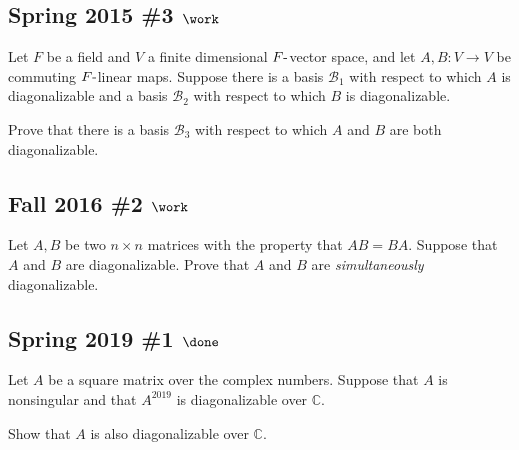 \hypertarget{spring-2015-3-work}{%
\subsection{\texorpdfstring{Spring 2015 \#3
\(\work\)}{Spring 2015 \#3 \textbackslash work}}\label{spring-2015-3-work}}

Let \(F\) be a field and \(V\) a finite dimensional
\(F{\hbox{-}}\)vector space, and let \(A, B: V\to V\) be commuting
\(F{\hbox{-}}\)linear maps. Suppose there is a basis \({\mathcal{B}}_1\)
with respect to which \(A\) is diagonalizable and a basis
\({\mathcal{B}}_2\) with respect to which \(B\) is diagonalizable.

Prove that there is a basis \({\mathcal{B}}_3\) with respect to which
\(A\) and \(B\) are both diagonalizable.

\hypertarget{fall-2016-2-work}{%
\subsection{\texorpdfstring{Fall 2016 \#2
\(\work\)}{Fall 2016 \#2 \textbackslash work}}\label{fall-2016-2-work}}

Let \(A, B\) be two \(n\times n\) matrices with the property that
\(AB = BA\). Suppose that \(A\) and \(B\) are diagonalizable. Prove that
\(A\) and \(B\) are \emph{simultaneously} diagonalizable.

\hypertarget{spring-2019-1-done}{%
\subsection{\texorpdfstring{Spring 2019 \#1
\(\done\)}{Spring 2019 \#1 \textbackslash done}}\label{spring-2019-1-done}}

Let \(A\) be a square matrix over the complex numbers. Suppose that
\(A\) is nonsingular and that \(A^{2019}\) is diagonalizable over
\({\mathbb{C}}\).

Show that \(A\) is also diagonalizable over \({\mathbb{C}}\).

